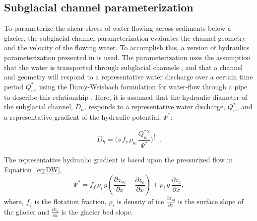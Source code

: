 \documentclass[11pt]{article}
\begin{document}
\begin{spacing}{1}
  \subsection{Subglacial channel  parameterization}
  \label{sect:sub_mode}
  To parameterize the shear stress of water flowing across sediments below a glacier, the subglacial channel parameterization evaluates the channel geometry and the velocity of the flowing water. 
  To accomplish this, a version of hydraulics parameterization presented in \citet{delaney2019} is used.
  The parameterization uses the assumption that the water is transported through subglacial channels \citep[Figure~\ref{fig:cartoon}; ][]{rothlisberger1972}, and that a channel and geometry will respond to a representative water discharge over a certain time period $Q_{w}^*$, using the Darcy-Weisbach formulation for water-flow through a pipe to describe this relationship \citep[e.g.][]{rothlisberger1972,clarke2003,werder2013}.
  Here, it is assumed that the hydraulic diameter of the subglacial channel, $D_h$, responds to a representative water discharge, $Q_{w}^*$, and a representative gradient of the hydraulic potential, $\Psi^*$:
  \begin{linenomath*}
    \begin{equation}
      \label{eq:DW}
      D_h = \big(s\, f_r\,\rho_w\, \frac{Q_w^{*\,2}}{\Psi^*}\big)^{\frac{1}{5}}~~.
    \end{equation}
  \end{linenomath*}
  The representative hydraulic gradient is based upon the pressurized flow in Equation~\ref{eq:DW},
  \begin{equation}
    \label{eq:psi}
    \Psi^*= f_f \,  \rho_i \, g (\frac{\partial  z_{sg}}{\partial x} - \frac{\partial z_c}{\partial x}) +  \rho_i \, g \, \frac{\partial z_c}{\partial x},
  \end{equation}
  \noindent
  where, $f_f$ is the flotation fraction, $\rho_i$ is density of ice $\frac{\partial z_{sg}}{\partial x}$ is the surface slope of the glacier and $\frac{\partial z_c}{\partial x}$ is the glacier bed slope.
  

\end{spacing}
\end{document}
